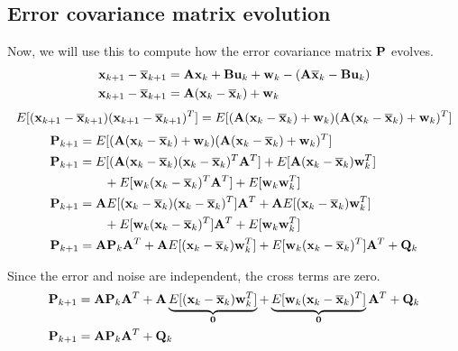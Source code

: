 \subsection{Error covariance matrix evolution}

Now, we will use this to compute how the \gls{error} covariance matrix $\mathbf{P}$
evolves.
\begin{align*}
  \mathbf{x}_{k+1} - \overline{\mathbf{x}}_{k+1} &= \mathbf{A}\mathbf{x}_k +
    \mathbf{B}\mathbf{u}_k + \mathbf{w}_k - (\mathbf{A}\overline{\mathbf{x}}_k - \mathbf{B}\mathbf{u}_k) \\
  \mathbf{x}_{k+1} - \overline{\mathbf{x}}_{k+1} &=
    \mathbf{A}(\mathbf{x}_k - \overline{\mathbf{x}}_k) + \mathbf{w}_k
\end{align*}
\begin{equation*}
  E[(\mathbf{x}_{k+1} - \overline{\mathbf{x}}_{k+1})(\mathbf{x}_{k+1} - \overline{\mathbf{x}}_{k+1})^T] =
    E[(\mathbf{A}(\mathbf{x}_k - \overline{\mathbf{x}}_k) + \mathbf{w}_k)
      (\mathbf{A}(\mathbf{x}_k - \overline{\mathbf{x}}_k) + \mathbf{w}_k)^T]
\end{equation*}
\begin{align*}
  \mathbf{P}_{k+1} &=
    E[(\mathbf{A}(\mathbf{x}_k - \overline{\mathbf{x}}_k) + \mathbf{w}_k)
      (\mathbf{A}(\mathbf{x}_k - \overline{\mathbf{x}}_k) + \mathbf{w}_k)^T] \\
  \mathbf{P}_{k+1} &=
    E[(\mathbf{A}(\mathbf{x}_k - \overline{\mathbf{x}}_k)(\mathbf{x}_k - \overline{\mathbf{x}}_k)^T
      \mathbf{A}^T] +
    E[\mathbf{A}(\mathbf{x}_k - \overline{\mathbf{x}}_k)\mathbf{w}_k^T] \\
    &\qquad + E[\mathbf{w}_k(\mathbf{x}_k - \overline{\mathbf{x}}_k)^T\mathbf{A}^T] +
    E[\mathbf{w}_k\mathbf{w}_k^T] \\
  \mathbf{P}_{k+1} &=
    \mathbf{A}E[(\mathbf{x}_k - \overline{\mathbf{x}}_k)(\mathbf{x}_k - \overline{\mathbf{x}}_k)^T]
    \mathbf{A}^T +
    \mathbf{A}E[(\mathbf{x}_k - \overline{\mathbf{x}}_k)\mathbf{w}_k^T] \\
    &\qquad + E[\mathbf{w}_k(\mathbf{x}_k - \overline{\mathbf{x}}_k)^T]\mathbf{A}^T +
    E[\mathbf{w}_k\mathbf{w}_k^T] \\
  \mathbf{P}_{k+1} &= \mathbf{A}\mathbf{P}_k\mathbf{A}^T +
    \mathbf{A}E[(\mathbf{x}_k - \overline{\mathbf{x}}_k)\mathbf{w}_k^T] +
    E[\mathbf{w}_k(\mathbf{x}_k - \overline{\mathbf{x}}_k)^T]\mathbf{A}^T + \mathbf{Q}_k
\end{align*}

Since the error and noise are independent, the cross terms are zero.
\begin{align*}
  \mathbf{P}_{k+1} &= \mathbf{A}\mathbf{P}_k\mathbf{A}^T +
    \mathbf{A}\underbrace{
      E[(\mathbf{x}_k - \overline{\mathbf{x}}_k)\mathbf{w}_k^T]}_{\mathbf{0}} +
    \underbrace{
      E[\mathbf{w}_k(\mathbf{x}_k - \overline{\mathbf{x}}_k)^T]}_{\mathbf{0}}\mathbf{A}^T + \mathbf{Q}_k \\
  \mathbf{P}_{k+1} &= \mathbf{A}\mathbf{P}_k\mathbf{A}^T + \mathbf{Q}_k
\end{align*}

